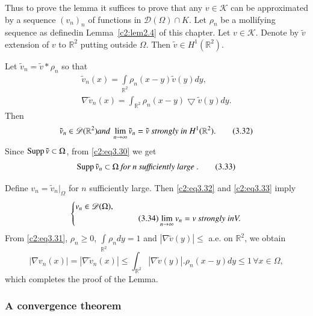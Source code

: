 Thus to prove the lemma it suffices to prove that any $v \in
\mathscr{K}$ can be approximated by a sequence $(v_n)_n$ of functions
in $\mathscr{D}(\Omega) \cap K$. Let $\rho_n$ be a mollifying sequence
as defined\pageoriginale  in Lemma~\ref{c2:lem2.4} of this chapter. Let $v \in
\mathscr{K}$. Denote by $\tilde{v}$ extension of $v$ to $\mathbb{R}^2$
putting outside $\Omega$. Then $\tilde{v} \in
H^1(\mathbb{R}^2)$. 

Let $ \tilde{v}_n = \tilde{v}* \rho_n$  so that 
  \begin{gather}
\tilde{v}_n (x) = \int\limits_{\mathbb{R}^2} \rho_n (x - y) \tilde{v}
(y)dy, \tag{3.30}\label{c2:eq3.30}\\ 
 \nabla \tilde{v}_n (x) = \int_{\mathbb{R}^2} \rho_n (x-y)
 \bigtriangledown\tilde{v} (y)dy.\tag{3.31}\label{c2:eq3.31} 
 \end{gather}
Then 
\begin{equation}
\tilde{v}_n \in \mathscr{D}(\mathbb{R}^2) \text{\em and } \lim_{n
  \to \infty} \tilde{v}_n = \tilde{v} ~\text{\em  strongly in } H^1
(\mathbb{R}^2).\tag{3.32}\label{c2:eq3.32} 
\end{equation}
 Since $\operatorname{Supp} \tilde{v} \subset \Omega$, from \eqref{c2:eq3.30} we get 
 \begin{equation}
\operatorname{Supp} \tilde{v}_n \subset \Omega ~\text{\em for $n$ sufficiently large
}.\tag{3.33}\label{c2:eq3.33} 
\end{equation}

 Define $v_n = \tilde{v}_n |_\Omega$ for $n$ sufficiently large. Then
 \eqref{c2:eq3.32} and \eqref{c2:eq3.33} imply  
 \begin{equation}
\begin{cases}
v_n \in \mathscr{D}(\Omega),\\
& \tag{3.34}\label{c2:eq3.34}
\lim\limits_{n \to \infty} v_n = v ~\text{\em strongly  in} V. 
\end{cases}
\end{equation}
  From \eqref{c2:eq3.31}, $\rho _n \geq 0$, $\int\limits_{\mathbb{R}^2} \rho_n dy
  = 1$ and $| \nabla \tilde{v} (y) | \leq $ a.e. on
  $\mathbb{R}^2$, we obtain  
\begin{equation}
|\nabla v_n (x)| = |\nabla \tilde{v} _n (x)| \leq
\int_{\mathbb{R}^2} |\nabla \tilde{v}(y)|. \rho_n (x-y) dy
\leq 1\, \forall  x \in \Omega,\tag{3.35}\label{c2:eq3.35} 
 \end{equation}  
 which completes the proof of the Lemma.
 
\subsubsection{A convergence theorem}\label{c2:sss3.6.2}%
 
